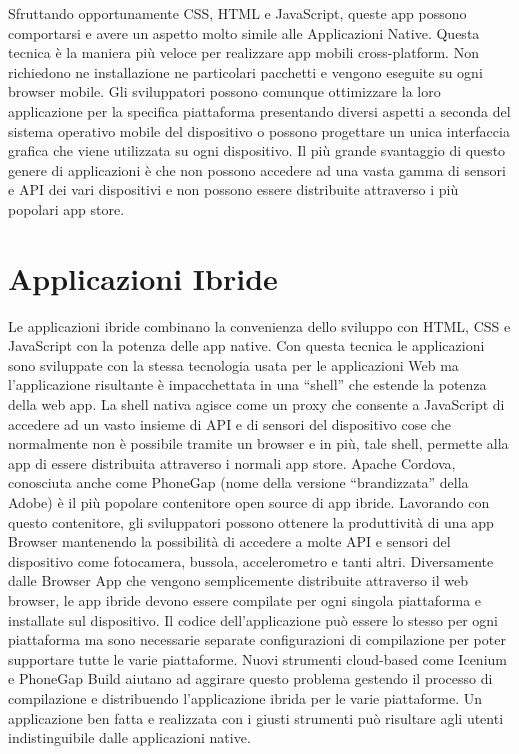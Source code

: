 Sfruttando opportunamente CSS, HTML e JavaScript, queste app possono comportarsi e avere un aspetto molto simile alle Applicazioni Native.
Questa tecnica è la maniera più veloce per realizzare app mobili cross-platform. Non richiedono ne installazione ne particolari pacchetti e vengono eseguite su ogni browser mobile. Gli sviluppatori possono comunque ottimizzare la loro applicazione per la specifica piattaforma presentando diversi aspetti a seconda del sistema operativo mobile del dispositivo o possono progettare un unica interfaccia grafica che viene utilizzata su ogni dispositivo.
Il più grande svantaggio di questo genere di applicazioni è che non possono accedere ad una vasta gamma di sensori e API dei vari dispositivi e non possono essere distribuite attraverso i più popolari app store.
		
	\section{Applicazioni Ibride}
		Le applicazioni ibride combinano la convenienza dello sviluppo con HTML, CSS e JavaScript con la potenza delle app native. Con questa tecnica le applicazioni sono sviluppate con la stessa tecnologia usata per le applicazioni Web ma l'applicazione risultante è impacchettata in una “shell” che estende la potenza della web app. La shell nativa agisce come un proxy che consente a JavaScript di accedere ad un vasto insieme di API e di sensori del dispositivo cose che normalmente non è possibile tramite un browser e in più, tale shell, permette alla app di essere distribuita attraverso i normali app store.
Apache Cordova, conosciuta anche come PhoneGap (nome della versione “brandizzata” della Adobe) è il più popolare contenitore open source di app ibride. Lavorando con questo contenitore, gli sviluppatori possono ottenere la produttività di una app Browser mantenendo la possibilità di accedere a molte API e sensori del dispositivo come fotocamera, bussola, accelerometro e tanti altri.
Diversamente dalle Browser App che vengono semplicemente distribuite attraverso il web browser, le app ibride devono essere compilate per ogni singola piattaforma e installate sul dispositivo. Il codice dell'applicazione può essere lo stesso per ogni piattaforma ma sono necessarie separate  configurazioni di compilazione per poter supportare tutte le varie piattaforme. Nuovi strumenti cloud-based come Icenium e PhoneGap Build aiutano ad aggirare questo problema gestendo il processo di compilazione e distribuendo l'applicazione ibrida per le varie piattaforme.
Un applicazione ben fatta e realizzata con i giusti strumenti può risultare agli utenti indistinguibile dalle applicazioni native.
		
